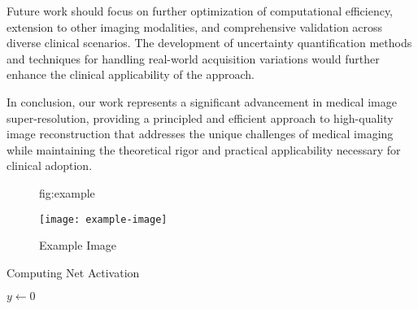 \documentclass{midl} %
\begin{document}
Future work should focus on further optimization of computational efficiency, extension to other imaging modalities, and comprehensive validation across diverse clinical scenarios. The development of uncertainty quantification methods and techniques for handling real-world acquisition variations would further enhance the clinical applicability of the approach.

In conclusion, our work represents a significant advancement in medical image super-resolution, providing a principled and efficient approach to high-quality image reconstruction that addresses the unique challenges of medical imaging while maintaining the theoretical rigor and practical applicability necessary for clinical adoption.

\begin{figure}[htbp]
\floatconts
  {fig:example}
  {\caption{Example Image}}
  {\texttt{[image: example-image]}}
\end{figure}

\begin{algorithm2e}
\caption{Computing Net Activation}
\label{alg:net}
{}
$y\leftarrow 0$\;
\end{algorithm2e}



\end{document}
